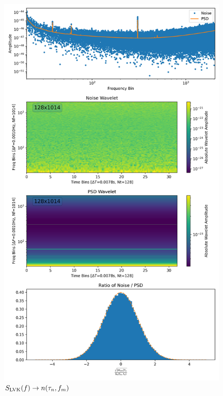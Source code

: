\documentclass{article}
\begin{document}
\begin{figure}[!tbp]
  \centering
  \begin{minipage}[b]{0.4\textwidth}
    \includegraphics[width=\textwidth]{figures/PSD/lvk_wavelet_psd.png}
    \caption{$S_{\rm LVK}(f)\rightarrow n(\tau_n,f_m)$}
  \end{minipage}
  \hfill
  \begin{minipage}[b]{0.4\textwidth}

\end{minipage}
\end{figure}
\end{document}
